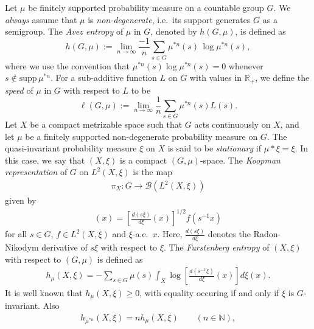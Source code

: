 \documentclass[12pt]{amsart}
\theoremstyle{definition}
\theoremstyle{remark}
\numberwithin{equation}{section}
\newcommand{\R}{\mathbb{R}}
\newcommand{\N}{\mathbb{N}}
\newcommand{\supp}{\text{supp}}
\newcommand{\mc}{\mathcal}
\begin{document}
Let $\mu$ be finitely supported probability measure on a countable group $G$. We \emph{always} assume that $\mu$ is {\it non-degenerate}, i.e.~its support generates $G$ as a semigroup. The \emph{Avez entropy} of $\mu$ in $G$, denoted by $h(G,\mu)$,  is defined as
\[
h(G,\mu):=\lim_{n\to \infty} \frac{-1}{n}\sum_{s\in G} \mu^{*n} (s) \, \log \mu^{*n} (s),
\]
where we use the convention that $\mu^{*n}(s)\log \mu^{*n}(s)=0$ whenever $s\notin \supp \, \mu^{*n}$. For a sub-additive function $L$ on $G$ with values in $\R_+$, we define the \emph{speed} of $\mu$ in $G$ with respect to $L$ to be
\[
\ell(G,\mu):=\lim_{n\to \infty} \frac{1}{n}\sum_{s\in G}\mu^{*n} (s) L(s).
\]
Let $X$ be a compact metrizable space such that $G$ acts continuously on $X$, and let $\mu$ be a finitely supported non-degenerate probability measure on $G$. The quasi-invariant probability measure $\xi$ on $X$ is said to be {\it stationary} if $\mu*\xi=\xi$. In this case, we say that $(X,\xi)$ is a compact $(G,\mu)$-space.
The \emph{Koopman representation} of $G$ on $L^2(X,\xi)$ is the map
\begin{align*} %
    \pi_{X}\colon G\to \mc{B}(L^2(X,\xi))
\end{align*}
given by
\begin{align*} %
[\pi_{X}(s)f](x)=\left[\frac{d(s\xi)}{d\xi}(x)\right]^{1/2} f(s^{-1}x)
\end{align*}
for all $s \in G$, $f\in L^2(X,\xi)$ and $\xi$-a.e.~$x$. Here,
$\frac{d(s\xi)}{d\xi}$ denotes the Radon-Nikodym derivative of $s\xi$ with respect to $\xi$.
The \emph{Furstenberg entropy} of $(X,\xi)$ with respect to $(G,\mu)$
is defined as
\begin{align*} %
  h_\mu(X,\xi)=- \sum_{s\in G} \mu(s) \int_X  \log \left[\frac{d(s^{-1}\xi)}{d\xi}(x)\right] d\xi(x).
\end{align*}
It is well known that $h_\mu(X,\xi)\geq 0$, with equality occuring if and only if $\xi$ is $G$-invariant. Also
\begin{align*}
h_{\mu^{*n}}(X,\xi)=nh_\mu(X,\xi)\qquad( n\in \N),
\end{align*}
\end{document}

